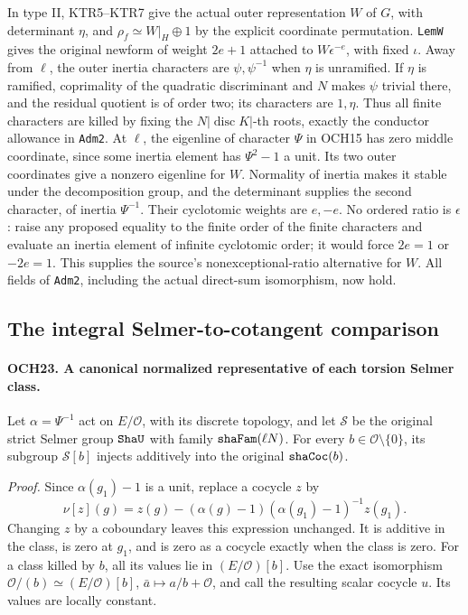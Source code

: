 \documentclass[11pt,a4paper]{article}
\numberwithin{equation}{section}
\theoremstyle{remark}\newtheorem{remark}[theorem]{Remark}
\begin{document}
In type II, KTR5--KTR7 give the actual outer representation \(W\)
of \(G\), with determinant \(\eta\), and
\(\rho_f\simeq W|_H\oplus1\) by the explicit coordinate
permutation.  \texttt{Lem\allowbreak W} gives the original newform of weight
\(2e+1\) attached to \(W\epsilon^{-e}\), with fixed \(\iota\).
Away from \(\ell\), the outer inertia characters are
\(\psi,\psi^{-1}\) when \(\eta\) is unramified.  If
\(\eta\) is ramified, coprimality of the quadratic discriminant
and \(N\) makes \(\psi\) trivial there, and the residual
quotient is of order two; its characters are \(1,\eta\).
Thus all finite characters are killed by fixing the
\(N|\operatorname{disc}K|\)-th roots, exactly the conductor
allowance in \texttt{Adm2}.
At \(\ell\), the eigenline of character \(\Psi\) in
OCH15 has zero middle coordinate, since some inertia element has
\(\Psi^2-1\) a unit.  Its two outer coordinates give a
nonzero eigenline for \(W\).  Normality of inertia makes it
stable under the decomposition group, and the determinant supplies
the second character, of inertia \(\Psi^{-1}\).
Their cyclotomic weights are \(e,-e\).  No ordered ratio is
\(\epsilon\): raise any proposed equality to the finite order
of the finite characters and evaluate an inertia element of
infinite cyclotomic order; it would force \(2e=1\) or
\(-2e=1\).  This supplies the source's nonexceptional-ratio
alternative for \(W\).  All fields of \texttt{Adm2}, including
the actual direct-sum isomorphism, now hold.

\subsection{The integral Selmer-to-cotangent comparison}

\paragraph{OCH23. A canonical normalized representative of each torsion Selmer class.}
\label{claim:OCH23}
Let \(\alpha=\Psi^{-1}\) act on \(E/\mathcal O\), with
its discrete topology, and let \(\mathcal S\) be the original
strict Selmer group \(\texttt{Sha\allowbreak U}\) with family
\(\texttt{sha\allowbreak Fam}(\ell N)\).  For every
\(b\in\mathcal O\setminus\{0\}\), its subgroup
\(\mathcal S[b]\) injects additively into the original
\(\texttt{sha\allowbreak Coc}(b)\).

\emph{Proof.}
Since \(\alpha(g_1)-1\) is a unit, replace a cocycle \(z\)
by
\[
 \nu[z](g)=z(g)-(\alpha(g)-1)
                     (\alpha(g_1)-1)^{-1}z(g_1).
 \tag{OCH.14}
\]
Changing \(z\) by a coboundary leaves this expression unchanged.
It is additive in the class, is zero at \(g_1\), and is zero
as a cocycle exactly when the class is zero.  For a class killed
by \(b\), all its values lie in \((E/\mathcal O)[b]\).
Use the exact isomorphism
\(\mathcal O/(b)\simeq(E/\mathcal O)[b]\),
\(\bar a\mapsto a/b+\mathcal O\), and call the resulting
scalar cocycle \(u\).  Its values are locally constant.
\end{document}
